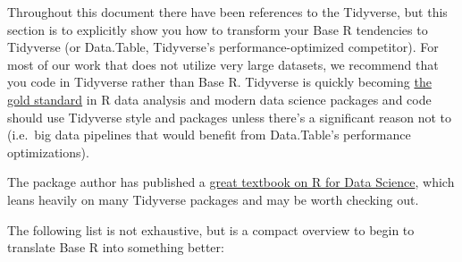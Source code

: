 \documentclass[
]{book}
\begin{document}
Throughout this document there have been references to the Tidyverse, but this section is to explicitly show you how to transform your Base R tendencies to Tidyverse (or Data.Table, Tidyverse's performance-optimized competitor). For most of our work that does not utilize very large datasets, we recommend that you code in Tidyverse rather than Base R. Tidyverse is quickly becoming \href{https://rviews.rstudio.com/2017/06/08/what-is-the-tidyverse/}{the gold standard} in R data analysis and modern data science packages and code should use Tidyverse style and packages unless there's a significant reason not to (i.e.~big data pipelines that would benefit from Data.Table's performance optimizations).

The package author has published a \href{https://r4ds.had.co.nz/}{great textbook on R for Data Science}, which leans heavily on many Tidyverse packages and may be worth checking out.

The following list is not exhaustive, but is a compact overview to begin to translate Base R into something better:
\end{document}
